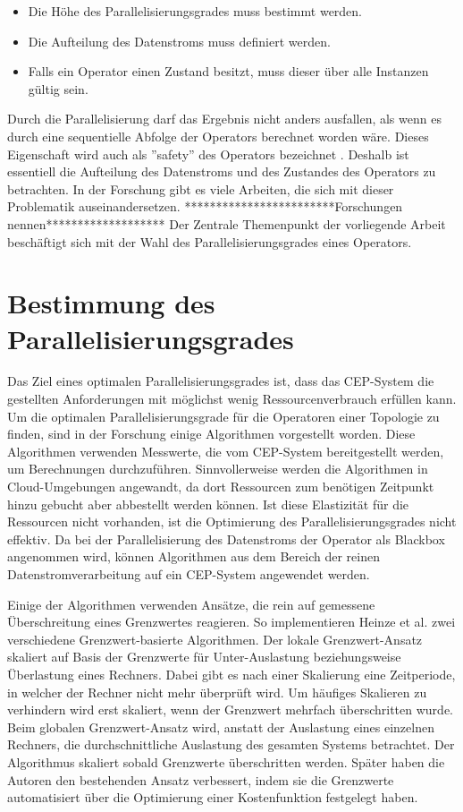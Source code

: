 \begin{itemize}
\item{Die Höhe des Parallelisierungsgrades muss bestimmt werden.}
\item{Die Aufteilung des Datenstroms muss definiert werden.}
\item{Falls ein Operator einen Zustand besitzt, muss dieser über alle Instanzen gültig sein.}
\end{itemize}

Durch die Parallelisierung darf das Ergebnis nicht anders ausfallen, als wenn es durch eine sequentielle Abfolge der Operators berechnet worden wäre.
Dieses Eigenschaft wird auch als ''safety'' des Operators bezeichnet \cite{gedik_elastic_2014}.
Deshalb ist essentiell die Aufteilung des Datenstroms und des Zustandes des Operators zu betrachten.
In der Forschung gibt es viele Arbeiten, die sich mit dieser Problematik auseinandersetzen. ************************Forschungen nennen*******************
Der Zentrale Themenpunkt der vorliegende Arbeit beschäftigt sich mit der Wahl des Parallelisierungsgrades eines Operators.

\section{Bestimmung des Parallelisierungsgrades}

Das Ziel eines optimalen Parallelisierungsgrades ist, dass das CEP-System die gestellten Anforderungen mit möglichst wenig Ressourcenverbrauch erfüllen kann.
Um die optimalen Parallelisierungsgrade für die Operatoren einer Topologie zu finden, sind in der Forschung einige Algorithmen vorgestellt worden.
Diese Algorithmen verwenden Messwerte, die vom CEP-System bereitgestellt werden, um Berechnungen durchzuführen.
Sinnvollerweise werden die Algorithmen in Cloud-Umgebungen angewandt, da dort Ressourcen zum benötigen Zeitpunkt hinzu gebucht aber abbestellt werden können.
Ist diese Elastizität für die Ressourcen nicht vorhanden, ist die Optimierung des Parallelisierungsgrades nicht effektiv.
Da bei der Parallelisierung des Datenstroms der Operator als Blackbox angenommen wird, können Algorithmen aus dem Bereich der reinen Datenstromverarbeitung auf ein CEP-System angewendet werden.

Einige der Algorithmen verwenden Ansätze, die rein auf gemessene Überschreitung eines Grenzwertes reagieren.
So implementieren Heinze et al. \cite{heinze_auto-scaling_2014} zwei verschiedene Grenzwert-basierte Algorithmen.
Der lokale Grenzwert-Ansatz skaliert auf Basis der Grenzwerte für Unter-Auslastung beziehungsweise Überlastung eines Rechners. 
Dabei gibt es nach einer Skalierung eine Zeitperiode, in welcher der Rechner nicht mehr überprüft wird.
Um häufiges Skalieren zu verhindern wird erst skaliert, wenn der Grenzwert mehrfach überschritten wurde.
Beim globalen Grenzwert-Ansatz wird, anstatt der Auslastung eines einzelnen Rechners, die durchschnittliche Auslastung des gesamten Systems betrachtet.
Der Algorithmus skaliert sobald Grenzwerte überschritten werden. 
Später haben die Autoren den bestehenden Ansatz verbessert, indem sie die Grenzwerte automatisiert über die Optimierung einer Kostenfunktion festgelegt haben\cite{heinze_online_2015}.

